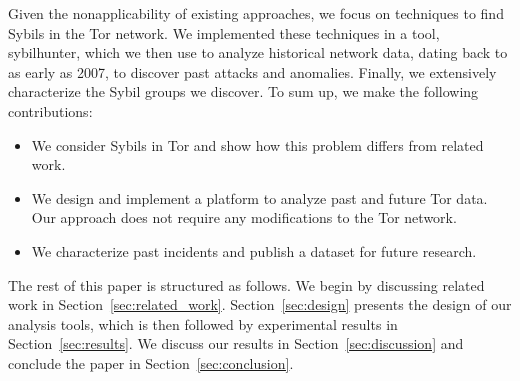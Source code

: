 Given the nonapplicability of existing approaches, we focus on techniques to
find Sybils in the Tor network.  We implemented these techniques in a tool,
sybilhunter, which we then use to analyze historical network data, dating back
to as early as 2007, to discover past attacks and anomalies.  Finally, we
extensively characterize the Sybil groups we discover.  To sum up, we make
the following contributions:
\begin{itemize}
	\item We consider Sybils in Tor and show how this problem differs from
		related work.
	\item We design and implement a platform to analyze past and future Tor
		data.  Our approach does not require any modifications to the Tor
		network.
	\item We characterize past incidents and publish a dataset for future
		research.
\end{itemize}

The rest of this paper is structured as follows.  We begin by discussing
related work in Section~\ref{sec:related_work}.  Section~\ref{sec:design}
presents the design of our analysis tools, which is then followed by
experimental results in Section~\ref{sec:results}.  We discuss our results in
Section~\ref{sec:discussion} and conclude the paper in
Section~\ref{sec:conclusion}.
